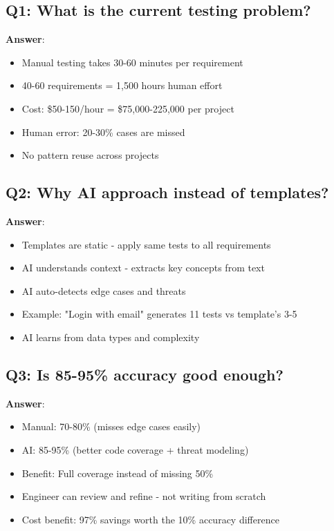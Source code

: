 \documentclass[12pt,a4paper]{report}
\begin{document}
\subsection{Q1: What is the current testing problem?}

\textbf{Answer}: 
\begin{itemize}
    \item Manual testing takes 30-60 minutes per requirement
    \item 40-60 requirements = 1,500 hours human effort
    \item Cost: \$50-150/hour = \$75,000-225,000 per project
    \item Human error: 20-30\% cases are missed
    \item No pattern reuse across projects
\end{itemize}

\subsection{Q2: Why AI approach instead of templates?}

\textbf{Answer}:
\begin{itemize}
    \item Templates are static - apply same tests to all requirements
    \item AI understands context - extracts key concepts from text
    \item AI auto-detects edge cases and threats
    \item Example: "Login with email" generates 11 tests vs template's 3-5
    \item AI learns from data types and complexity
\end{itemize}

\subsection{Q3: Is 85-95\% accuracy good enough?}

\textbf{Answer}:
\begin{itemize}
    \item Manual: 70-80\% (misses edge cases easily)
    \item AI: 85-95\% (better code coverage + threat modeling)
    \item Benefit: Full coverage instead of missing 50\%
    \item Engineer can review and refine - not writing from scratch
    \item Cost benefit: 97\% savings worth the 10\% accuracy difference
\end{itemize}
\end{document}
